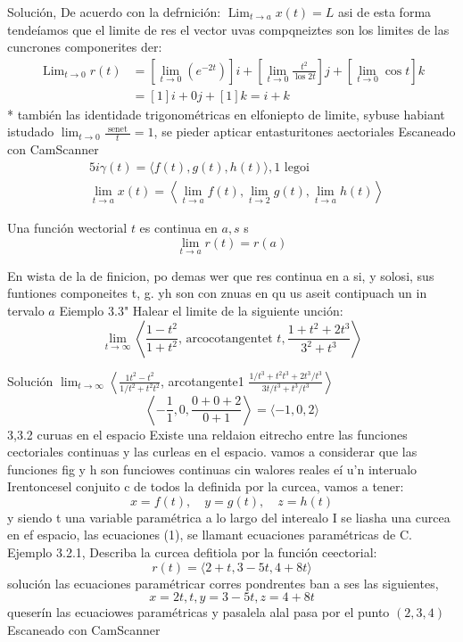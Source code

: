 Solución, De acuerdo con la defrnición:
$\operatorname{Lim}_{t \rightarrow a} x(t)=L$ asi de esta forma tendeíamos que el limite de res el vector uvas compqneiztes son los limites de las cuncrones componerites der:
$$
\begin{aligned}
	\operatorname{Lim}_{t \rightarrow 0} r(t) & =\left[\lim _{t \rightarrow 0}\left(e^{-2 t}\right)\right] i+\left[\lim _{t \rightarrow 0} \frac{t^2}{\operatorname{los} 2 t}\right] j+\left[\lim _{t \rightarrow 0} \cos t\right] k \\
	& =[1] i+0 j+[1] k=i+k
\end{aligned}
$$
* también las identidade trigonométricas en elfoniepto de limite, sybuse habiant istudado $\lim _{t \rightarrow 0} \frac{\text { senet }}{t}=1$, se pieder apticar entasturitones aectoriales
Escaneado con CamScanner
$$
\begin{aligned}
	& 5 i \gamma(t)=\langle f(t), g(t), h(t)\rangle, 1 \text { legoi } \\
	& \lim _{t \rightarrow a} x(t)=\left\langle\lim _{t \rightarrow a} f(t), \lim _{t \rightarrow 2} g(t), \lim _{t \rightarrow a} h(t)\right\rangle
\end{aligned}
$$




Una función wectorial $t$ es continua en $a, s$ s
$$
\lim _{t \rightarrow a} r(t)=r(a)
$$

En wista de la de finicion, po demas wer que res continua en a si, y solosi, sus funtiones componeites t, g. yh son con znuas en qu us aseit contipuach un in tervalo $a$ Eiemplo 3.3" Halear el limite de la siguiente unción:
$$
\lim _{t \rightarrow \infty}\left\langle\frac{1-t^2}{1+t^2} \text {, arcocotangentet } t, \frac{1+t^2+2 t^3}{3^2+t^3}\right\rangle
$$

Solución $\lim _{t \rightarrow \infty}\left\langle\frac{1 t^2-t^2}{1 / t^2+t^2 t^2}\right.$, arcotangente1 $\left.\frac{1 / t^3+t^2 t^3+2 t^3 / t^3}{3 t / t^3+t^3 / t^3}\right\rangle$
$$
\left\langle-\frac{1}{1}, 0, \frac{0+0+2}{0+1}\right\rangle=\langle-1,0,2\rangle
$$
3,3.2 curuas en el espacio
Existe una reldaion eitrecho entre las funciones cectoriales continuas y las curleas en el espacio. vamos a considerar que las funciones fig y h son funciowes continuas cin walores reales eí u'n interualo Irentoncesel conjuito c de todos la definida por la curcea, vamos a tener:
$$
x=f(t), \quad y=g(t), \quad z=h(t)
$$
y siendo t una variable paramétrica a lo largo
del interealo I se liasha una curcea en ef espacio, las ecuaciones (1), se llamant ecuaciones paramétricas de C.
Ejemplo 3.2.1, Describa la curcea defitiola por la función ceectorial:
$$
r(t)=\langle 2+t, 3-5 t, 4+8 t\rangle
$$
solución las ecuaciones paramétricar corres pondrentes ban a ses las siguientes,
$$
x=2 t, t, y=3-5 t, z=4+8 t
$$
queserín las ecuaciowes paramétricas
y pasalela alal pasa por el punto $(2,3,4)$
Escaneado con CamScanner


